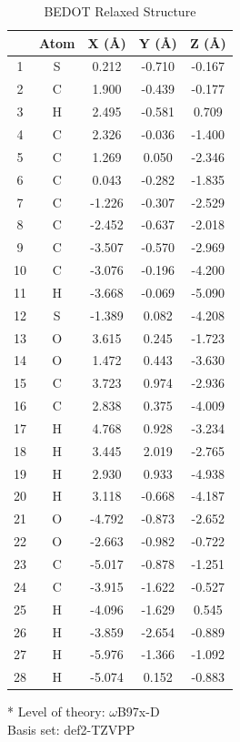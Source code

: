 \begin{table}[hbt!]\centering
\caption{BEDOT Relaxed Structure}
\renewcommand{\arraystretch}{1.25}
\begin{threeparttable}
\begin{tabular}{ccccc}\toprule
{} & {Atom} & {X (\AA)} & {Y (\AA)} & {Z (\AA)} \\ \midrule
    1 & S & 0.212 & -0.710 & -0.167\\
    2 & C & 1.900 & -0.439 & -0.177\\
    3 & H & 2.495 & -0.581 & 0.709\\
    4 & C & 2.326 & -0.036 & -1.400\\
    5 & C & 1.269 & 0.050 & -2.346\\
    6 & C & 0.043 & -0.282 & -1.835\\
    7 & C & -1.226 & -0.307 & -2.529\\
    8 & C & -2.452 & -0.637 & -2.018\\
    9 & C & -3.507 & -0.570 & -2.969\\
    10 & C & -3.076 & -0.196 & -4.200\\
    11 & H & -3.668 & -0.069 & -5.090\\
    12 & S & -1.389 & 0.082 & -4.208\\
    13 & O & 3.615 & 0.245 & -1.723\\
    14 & O & 1.472 & 0.443 & -3.630\\
    15 & C & 3.723 & 0.974 & -2.936\\
    16 & C & 2.838 & 0.375 & -4.009\\
    17 & H & 4.768 & 0.928 & -3.234\\
    18 & H & 3.445 & 2.019 & -2.765\\
    19 & H & 2.930 & 0.933 & -4.938\\
    20 & H & 3.118 & -0.668 & -4.187\\
    21 & O & -4.792 & -0.873 & -2.652\\
    22 & O & -2.663 & -0.982 & -0.722\\
    23 & C & -5.017 & -0.878 & -1.251\\
    24 & C & -3.915 & -1.622 & -0.527\\
    25 & H & -4.096 & -1.629 & 0.545\\
    26 & H & -3.859 & -2.654 & -0.889\\
    27 & H & -5.976 & -1.366 & -1.092\\
    28 & H & -5.074 & 0.152 & -0.883\\ \bottomrule
\end{tabular}
\begin{tablenotes}
\item[*] \footnotesize Level of theory: $\omega$B97x-D \\ Basis set: def2-TZVPP
\end{tablenotes}
\end{threeparttable}
\end{table}

